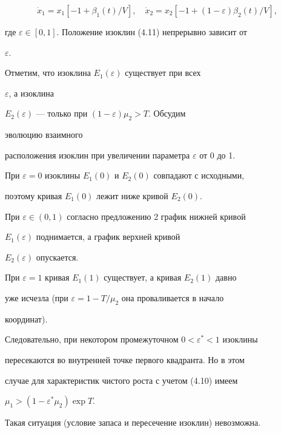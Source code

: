 \begin{equation} 


\Dot x_1=x_1[-1+\beta_1(t)/V],\quad 


\Dot x_2=x_2[-1+(1-\varepsilon)\beta_2(t)/V], 


\end{equation} 


где $\varepsilon\in[0,1]$. Положение изоклин (4.11) непрерывно зависит от 


$\varepsilon$. 


Отметим, что изоклина $E_1(\varepsilon)$ существует при всех 


$\varepsilon$, а изоклина 


$E_2(\varepsilon)$ --- только при $(1-\varepsilon)\mu_2>T$. Обсудим 


эволюцию взаимного 


расположения изоклин при увеличении параметра $\varepsilon$ от 0 до 1. 


 


При $\varepsilon=0$ изоклины $E_1(0)$ и $E_2(0)$ совпадают с исходными, 


поэтому кривая $E_1(0)$ лежит ниже кривой $E_2(0)$. 


 


При $\varepsilon\in(0,1)$ согласно предложению 2 график нижней кривой 


$E_1(\varepsilon)$ поднимается, а график верхней кривой 


$E_2(\varepsilon)$ опускается. 


 


При $\varepsilon=1$ кривая $E_1(1)$ существует, а кривая $E_2(1)$ давно 


уже исчезла (при $\varepsilon=1-T/\mu_2$ она проваливается в начало 


координат). 


 


Следовательно, при некотором промежуточном $0<\varepsilon^*<1$ изоклины 


пересекаются во внутренней точке первого квадранта. Но в этом 


случае для характеристик чистого роста с учетом (4.10) имеем 


$\mu_1>(1-\varepsilon^*\mu_2)\exp T$. 


Такая ситуация (условие запаса и пересечение изоклин) невозможна. 


